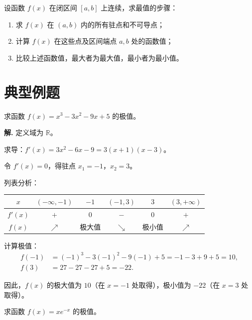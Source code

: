 \documentclass[11pt]{ctexrep}
\begin{document}
\begin{property}[闭区间上最值的求法]
    设函数 $f(x)$ 在闭区间 $[a, b]$ 上连续，求最值的步骤：
    \begin{enumerate}
        \item 求 $f(x)$ 在 $(a, b)$ 内的所有驻点和不可导点；
        \item 计算 $f(x)$ 在这些点及区间端点 $a, b$ 处的函数值；
        \item 比较上述函数值，最大者为最大值，最小者为最小值。
    \end{enumerate}
\end{property}

\section*{典型例题}

\begin{example}[求函数的极值]
    求函数 $f(x) = x^3 - 3x^2 - 9x + 5$ 的极值。
\end{example}

\textbf{解.} 定义域为 $\mathbb{R}$。

求导：$f'(x) = 3x^2 - 6x - 9 = 3(x + 1)(x - 3)$。

令 $f'(x) = 0$，得驻点 $x_1 = -1$，$x_2 = 3$。

列表分析：
\begin{center}
\begin{tabular}{c|ccccc}
\hline
$x$ & $(-\infty, -1)$ & $-1$ & $(-1, 3)$ & $3$ & $(3, +\infty)$ \\
\hline
$f'(x)$ & $+$ & $0$ & $-$ & $0$ & $+$ \\
\hline
$f(x)$ & $\nearrow$ & 极大值 & $\searrow$ & 极小值 & $\nearrow$ \\
\hline
\end{tabular}
\end{center}

计算极值：
\begin{align*}
    f(-1) &= (-1)^3 - 3(-1)^2 - 9(-1) + 5 = -1 - 3 + 9 + 5 = 10, \\[4pt]
    f(3) &= 27 - 27 - 27 + 5 = -22.
\end{align*}

因此，$f(x)$ 的极大值为 $10$（在 $x = -1$ 处取得），极小值为 $-22$（在 $x = 3$ 处取得）。

\begin{example}[利用二阶导数判断极值]
    求函数 $f(x) = x e^{-x}$ 的极值。
\end{example}
\end{document}
